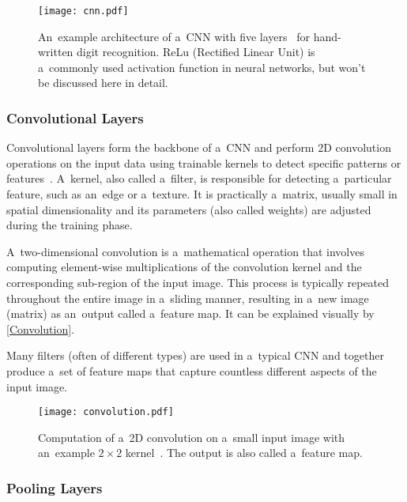 \begin{figure}[t]
    \centering
    \texttt{[image: cnn.pdf]}
    \captionsetup{width=0.75\textwidth}
    \caption{An~example architecture of a~CNN with five layers~\cite{OShea2015}
    for hand-written digit recognition.  ReLu (Rectified Linear Unit) is
a~commonly used activation function in neural networks, but won't be discussed
    here in detail.}
    \label{CNNFig}
\end{figure}

\subsubsection{Convolutional Layers}

Convolutional layers form the backbone of a~CNN and perform 2D convolution
operations on the input data using trainable kernels to detect specific patterns
or features~\cite{OShea2015}. A~kernel, also called a~filter, is responsible
for detecting a~particular feature, such as an~edge or a~texture. It is
practically a~matrix, usually small in spatial dimensionality and its
parameters (also called weights) are adjusted during the training phase.

A~two-dimensional convolution is a~mathematical operation that involves
computing element-wise multiplications of the convolution kernel and the
corresponding sub-region of the input image. This process is typically repeated
throughout the entire image in a~sliding manner, resulting in a~new image
(matrix) as an~output called a~feature map. It can be explained visually by
\autoref{Convolution}.

Many filters (often of different types) are used in a~typical CNN and together
produce a~set of feature maps that capture countless different aspects of the
input image.

\begin{figure}[t]
    \centering
    \texttt{[image: convolution.pdf]}
    \captionsetup{width=0.6\textwidth}
    \caption{Computation of a~2D convolution on a~small input image with
    an~example $2 \times 2$ kernel~\cite{zhang2021dive}. The output is also
    called a~feature map.}
    \label{Convolution}
\end{figure}


\subsubsection{Pooling Layers}

